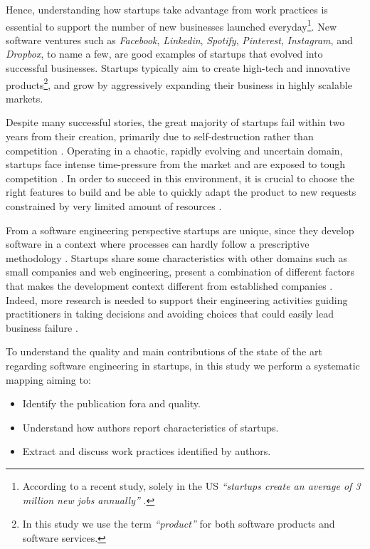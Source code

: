 \documentclass[final,5p,times,twocolumn]{elsarticle}
\begin{document}
Hence, understanding how startups take advantage from work practices is essential to support the number of new businesses launched everyday\footnote{According to a recent study, solely in the US \textit{``startups create an average of 3 million new jobs annually''} \cite{Formation2010}.}. New software ventures such as \textit{Facebook}, \textit{Linkedin}, \textit{Spotify}, \textit{Pinterest}, \textit{Instagram}, and \textit{Dropbox}, to name a few, are good examples of startups that evolved into successful businesses. Startups typically aim to create high-tech and innovative products\footnote{In this study we use the term \textit{``product''} for both software products and software services.}, and grow by aggressively expanding their business in highly scalable markets.

Despite many successful stories, the great majority of startups fail within two years from their creation, primarily due to self-destruction rather than competition \cite{Crowne2002}. Operating in a chaotic, rapidly evolving and uncertain domain, startups face intense time-pressure from the market and are exposed to tough competition \cite{Maccormack2001, Eisenhardt1998}. In order to succeed in this environment, it is crucial to choose the right features to build  and be able to quickly adapt the product to new requests constrained by very limited amount of resources \cite{Sutton2000}.

From a software engineering perspective startups are unique, since they develop software in a context where processes can hardly follow a prescriptive methodology \cite{Coleman2008}. Startups share some characteristics with other domains such as small companies and web engineering, present a combination of different factors that makes the development context different from established companies \cite{Blank2005}. Indeed, more research is needed to support their engineering activities guiding practitioners in taking decisions and avoiding choices that could easily lead business failure \cite{Kajko-Mattsson2008,Coleman2005}.

To understand the quality and main contributions of the state of the art regarding software engineering in startups, in this study we perform a systematic mapping aiming to:
\begin{itemize}

\item Identify the publication fora and quality.
\item Understand how authors report characteristics of startups.
\item Extract and discuss work practices identified by authors.
\end{itemize}
\end{document}
